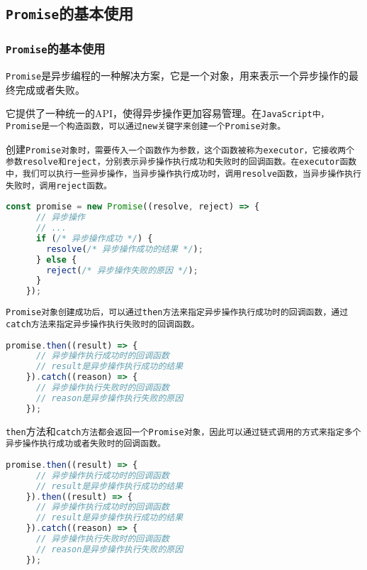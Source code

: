 \documentclass{beamer}
\begin{document}
\subsection{\texttt{Promise}的基本使用}
\begin{frame}
  \frametitle{\texttt{Promise}的基本使用}
  \texttt{Promise}是异步编程的一种解决方案，它是一个对象，用来表示一个异步操作的最终完成或者失败。

  \vspace{1em}

  它提供了一种统一的API，使得异步操作更加容易管理。在\tt{JavaScript}中，\tt{Promise}是一个构造函数，可以通过\tt{new}关键字来创建一个\tt{Promise}对象。


  \vspace{1em}


  创建\tt{Promise}对象时，需要传入一个函数作为参数，这个函数被称为\tt{executor}，它接收两个参数\tt{resolve}和\tt{reject}，分别表示异步操作执行成功和失败时的回调函数。在\tt{executor}函数中，我们可以执行一些异步操作，当异步操作执行成功时，调用\tt{resolve}函数，当异步操作执行失败时，调用\tt{reject}函数。

  \begin{lstlisting}[language=JavaScript]
    const promise = new Promise((resolve, reject) => {
      // 异步操作
      // ...
      if (/* 异步操作成功 */) {
        resolve(/* 异步操作成功的结果 */);
      } else {
        reject(/* 异步操作失败的原因 */);
      }
    });
\end{lstlisting}

  \framebreak

  \tt{Promise}对象创建成功后，可以通过\tt{then}方法来指定异步操作执行成功时的回调函数，通过\tt{catch}方法来指定异步操作执行失败时的回调函数。

  \begin{lstlisting}[language=JavaScript]
    promise.then((result) => {
      // 异步操作执行成功时的回调函数
      // result是异步操作执行成功的结果
    }).catch((reason) => {
      // 异步操作执行失败时的回调函数
      // reason是异步操作执行失败的原因
    });
\end{lstlisting}

  \framebreak

  \texttt{then}方法和\tt{catch}方法都会返回一个\tt{Promise}对象，因此可以通过链式调用的方式来指定多个异步操作执行成功或者失败时的回调函数。

  \begin{lstlisting}[language=JavaScript]
    promise.then((result) => {
      // 异步操作执行成功时的回调函数
      // result是异步操作执行成功的结果
    }).then((result) => {
      // 异步操作执行成功时的回调函数
      // result是异步操作执行成功的结果
    }).catch((reason) => {
      // 异步操作执行失败时的回调函数
      // reason是异步操作执行失败的原因
    });
\end{lstlisting}


\end{frame}
\end{document}
